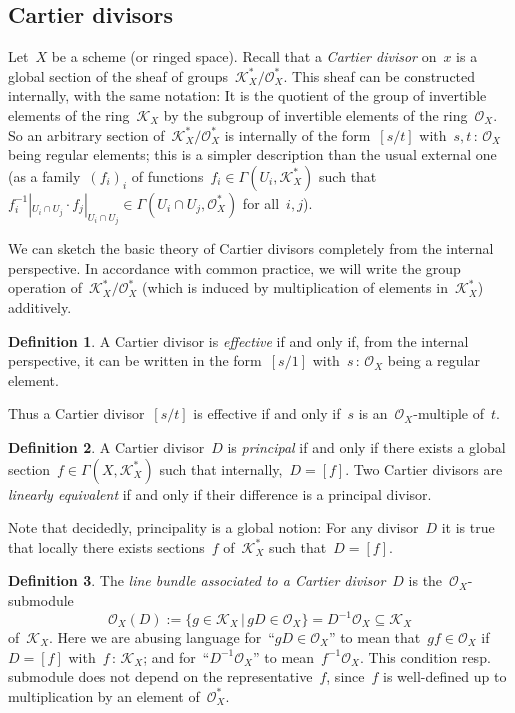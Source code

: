 \documentclass[10pt]{amsart}
\theoremstyle{definition}
\newtheorem{defn}{Definition}[section]
\theoremstyle{plain}
\theoremstyle{remark}
\renewcommand{\O}{\mathcal{O}}
\newcommand{\K}{\mathcal{K}}
\newcommand{\?}{\,{:}\,}
\renewcommand{\_}{\mathpunct{.}\,}
\begin{document}
\subsection{Cartier divisors} Let~$X$ be a scheme (or ringed space). Recall
that a \emph{Cartier divisor} on~$x$ is a global section of the sheaf of
groups~$\K_X^* / \O_X^*$. This sheaf can be constructed internally, with the
same notation: It is the quotient of the group of invertible elements of the
ring~$\K_X$ by the subgroup of invertible elements of the ring~$\O_X$. So an
arbitrary section of~$\K_X^*/\O_X^*$ is internally of the form~$[s/t]$
with~$s,t\?\O_X$ being regular elements; this is a simpler description than the
usual external one (as a family~$(f_i)_i$ of functions~$f_i \in
\Gamma(U_i,\K_X^*)$ such that~$f_i^{-1}|_{U_i \cap U_j} \cdot f_j|_{U_i \cap
U_j} \in \Gamma(U_i \cap U_j, \O_X^*)$ for all~$i,j$).

We can sketch the basic theory of Cartier divisors completely from the internal
perspective. In accordance with common practice, we will write the group
operation of~$\K_X^*/\O_X^*$ (which is induced by multiplication of elements
in~$\K_X^*$) additively.

\begin{defn}A Cartier divisor is \emph{effective} if and only if, from the
internal perspective, it can be written in the form~$[s/1]$ with~$s\?\O_X$
being a regular element.\end{defn}

Thus a Cartier divisor~$[s/t]$ is effective if and only if~$s$ is
an~$\O_X$-multiple of~$t$.

\begin{defn}A Cartier divisor~$D$ is \emph{principal} if and only if there
exists a global section~$f \in \Gamma(X,\K_X^*)$ such that internally,~$D = [f]$.
Two Cartier divisors are \emph{linearly equivalent} if and only if their
difference is a principal divisor.
\end{defn}

Note that decidedly, principality is a global notion: For any divisor~$D$ it is
true that locally there exists sections~$f$ of~$\K_X^*$ such that~$D = [f]$.

\begin{defn}The \emph{line bundle associated to a Cartier divisor}~$D$
is the~$\O_X$-submodule
\[ \O_X(D) := \{ g \in \K_X \,|\, g D \in \O_X \} = D^{-1} \O_X \subseteq \K_X
\]
of~$\K_X$. Here we are abusing language for~``$gD \in \O_X$'' to mean that~$gf
\in \O_X$ if~$D = [f]$ with~$f\?\K_X$; and for~``$D^{-1} \O_X$'' to
mean~$f^{-1}\O_X$. This condition resp. submodule does not depend on the
representative~$f$, since~$f$ is well-defined up to multiplication by an element
of~$\O_X^*$.\end{defn}
\end{document}
